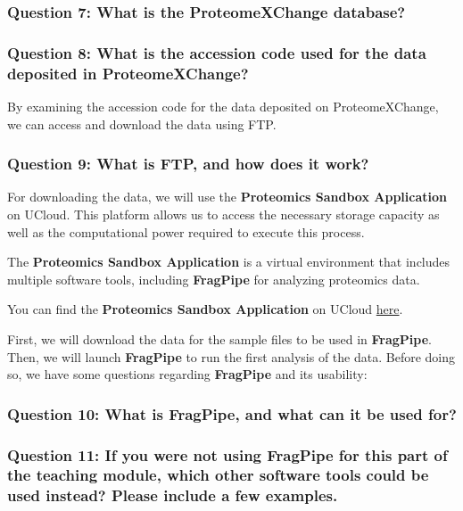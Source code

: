 \documentclass[
  letterpaper,
  DIV=11,
  numbers=noendperiod]{scrartcl}
\begin{document}
\subsubsection{Question 7: What is the ProteomeXChange
database?}\label{question-7-what-is-the-proteomexchange-database}

\subsubsection{Question 8: What is the accession code used for the data
deposited in
ProteomeXChange?}\label{question-8-what-is-the-accession-code-used-for-the-data-deposited-in-proteomexchange}

By examining the accession code for the data deposited on
ProteomeXChange, we can access and download the data using FTP.

\subsubsection{Question 9: What is FTP, and how does it
work?}\label{question-9-what-is-ftp-and-how-does-it-work}

For downloading the data, we will use the \textbf{Proteomics Sandbox
Application} on UCloud. This platform allows us to access the necessary
storage capacity as well as the computational power required to execute
this process.

The \textbf{Proteomics Sandbox Application} is a virtual environment
that includes multiple software tools, including \textbf{FragPipe} for
analyzing proteomics data.

You can find the \textbf{Proteomics Sandbox Application} on UCloud
\href{https://cloud.sdu.dk/app/jobs/create?app=proteomics}{here}.

First, we will download the data for the sample files to be used in
\textbf{FragPipe}. Then, we will launch \textbf{FragPipe} to run the
first analysis of the data. Before doing so, we have some questions
regarding \textbf{FragPipe} and its usability:

\subsubsection{Question 10: What is FragPipe, and what can it be used
for?}\label{question-10-what-is-fragpipe-and-what-can-it-be-used-for}

\subsubsection{Question 11: If you were not using FragPipe for this part
of the teaching module, which other software tools could be used
instead? Please include a few
examples.}\label{question-11-if-you-were-not-using-fragpipe-for-this-part-of-the-teaching-module-which-other-software-tools-could-be-used-instead-please-include-a-few-examples.}
\end{document}
